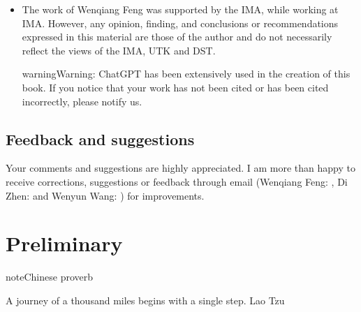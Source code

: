 \documentclass[letterpaper,11pt,english]{sphinxmanual}
\begin{document}
\begin{itemize}
\begin{itemize}
\item {} 
\sphinxAtStartPar
{} is currently a Ph.D. candidate in Applied Physics at
Harvard University. She also holds a Master’s degree in Computational
Science and Engineering from Harvard University. Her research interests
lie at the intersection of data science, machine learning, and
generative AI, with a focus on solving practical problems in scientific
research and real\sphinxhyphen{}world applications. She is passionate about leveraging
advanced computational techniques to extract insights from complex data
and drive innovation across diverse domains.

\end{itemize}

\item {} 
\sphinxAtStartPar
{}

\sphinxAtStartPar
The work of Wenqiang Feng was supported by the IMA, while working at IMA. However, any opinion, finding,
and conclusions or recommendations expressed in this material are those of the author and do not necessarily
reflect the views of the IMA, UTK and DST.

\begin{sphinxadmonition}{warning}{Warning:}
\sphinxAtStartPar
ChatGPT has been extensively used in the creation of this book. If you notice that your work has not been
cited or has been cited incorrectly, please notify us.
\end{sphinxadmonition}

\end{itemize}


\section{Feedback and suggestions}
\label{\detokenize{preface:feedback-and-suggestions}}
\sphinxAtStartPar
Your comments and suggestions are highly appreciated. I am more than happy to receive
corrections, suggestions or feedback through email (Wenqiang Feng: ,
Di Zhen:  and Wenyun Wang: ) for improvements.

\sphinxstepscope


\chapter{Preliminary}
\label{\detokenize{prelim:preliminary}}\label{\detokenize{prelim:prelim}}\label{\detokenize{prelim::doc}}
\begin{sphinxadmonition}{note}{Chinese proverb}

\sphinxAtStartPar
A journey of a thousand miles begins with a single step. \textendash{} Lao Tzu
\end{sphinxadmonition}
\end{document}
